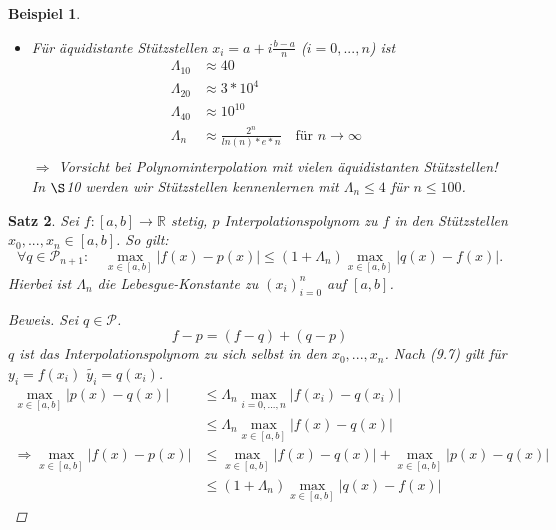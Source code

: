\documentclass[12pt]{article}
\theoremstyle{break}
\newtheorem{theorem}{Satz}[subsection]
\newtheorem{example}[theorem]{Beispiel}
\begin{document}
\begin{example}
\begin{description}\item \end{description}
\begin{itemize}
  \item Für äquidistante Stützstellen $x_i = a + i\frac{b-a}{n}$ ($i=0,...,n$) ist 
    \begin{align*}
    \Lambda_{10} &\approx 40 &\\
    \Lambda_{20} &\approx 3*10^4 &\\
    \Lambda_{40} &\approx 10^{10} &\\
    \Lambda_{n} &\approx \frac{2^n}{ln(n)*e*n} \quad \text{für } n \rightarrow \infty&\\
    \end{align*}
    $\Rightarrow$ Vorsicht bei Polynominterpolation mit vielen äquidistanten Stützstellen! \\
    In $\S$10 werden wir Stützstellen kennenlernen mit $\Lambda_n \leq 4$ für $n \leq 100$.
\end{itemize}
\end{example}

\begin{theorem}
Sei $f\colon [a,b] \rightarrow \mathbb{R}$ stetig, $p$ Interpolationspolynom zu $f$ in den Stützstellen $x_0,..., x_n \in [a,b]$. So gilt:
\[ \forall q \in \mathcal{P}_{n+1}\colon \quad \max_{x \in [a,b] } \vert f(x) -p(x) \vert \leq (1+ \Lambda_n) \max_{x \in [a,b]} \vert q(x) - f(x) \vert .\]
Hierbei ist $\Lambda_n$ die Lebesgue-Konstante zu $(x_i)_{i=0}^n$ auf $[a,b]$.
\begin{proof}[Beweis]
Sei $q \in \mathcal{P}$.
\[ f-p = (f-q) + (q-p)\]
$q$ ist das Interpolationspolynom zu sich selbst in den $x_0,..., x_n$. Nach (9.7) gilt für $y_i = f(x_i)$ $\tilde{y_i}  = q(x_i)$.
\begin{align*}
\max_{x \in [a,b]} \vert p(x) - q(x) \vert &\leq \Lambda_n \max_{i=0,...,n} \vert f(x_i) - q(x_i) \vert &\\
&\leq \Lambda_n \max_{x \in [a,b]} \vert f(x)-q(x) \vert &\\
\Rightarrow \max_{x \in [a,b]} \vert f(x) - p(x) \vert &\leq \max_{x \in [a,b]} \vert f(x)-q(x) \vert + \max_{x \in [a,b]} \vert p(x)-q(x) \vert &\\
&\leq (1+ \Lambda_n) \max_{x \in [a,b]} \vert q(x) - f(x) \vert 
\end{align*}
\end{proof}
\end{theorem}
\end{document}
